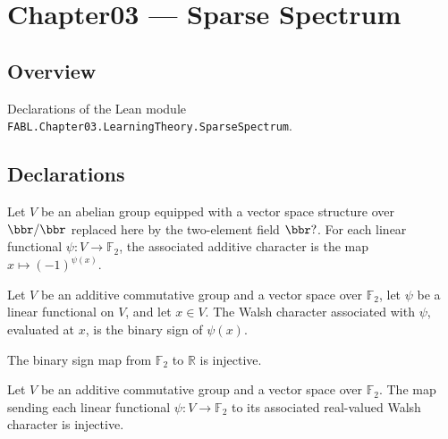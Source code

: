 \chapter{Chapter03 — Sparse Spectrum}
\section{Overview}

Declarations of the Lean module \texttt{FABL.Chapter03.LearningTheory.SparseSpectrum}.

\section{Declarations}

\begin{definition}
\label{FABL.dualWalshCharacter}
\leanok
{}
Let $V$ be an abelian group equipped with a vector space structure over $\bbr/\bbr$
replaced here by the two-element field $\bbr?$. For each linear functional
$\psi:V\to\mathbb{F}_2$, the associated additive character is the map
$x\mapsto(-1)^{\psi(x)}$.
\end{definition}

\begin{theorem}
\label{FABL.dualWalshCharacter_apply}
\leanok
{}
Let $V$ be an additive commutative group and a vector space over $\mathbb{F}_2$, let
$\psi$ be a linear functional on $V$, and let $x\in V$. The Walsh character associated
with $\psi$, evaluated at $x$, is the binary sign of $\psi(x)$.
\end{theorem}

\begin{theorem}
\label{FABL.binarySign_injective}
\leanok
{}
The binary sign map from $\mathbb{F}_2$ to $\mathbb{R}$ is injective.
\end{theorem}

\begin{theorem}
\label{FABL.dualWalshCharacter_injective}
\leanok
{}
Let $V$ be an additive commutative group and a vector space over $\mathbb{F}_2$. The map
sending each linear functional $\psi:V\to\mathbb{F}_2$ to its associated real-valued
Walsh character is injective.
\end{theorem}

